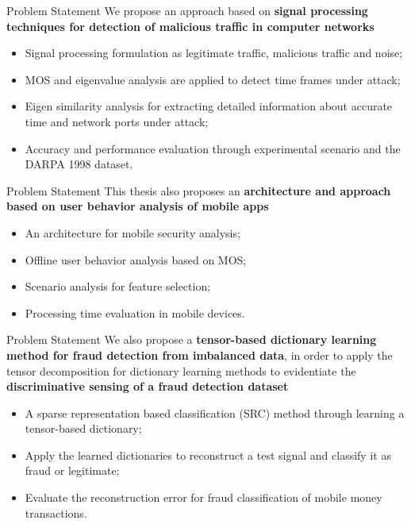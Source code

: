 \documentclass[newPxFont, numfooter, sectionpages]{beamer}
\begin{document}
\begin{frame}[c]{Problem Statement}
	We propose an approach based on \textbf{signal processing techniques for detection of malicious traffic in computer networks}
	\begin{itemize}
		\item Signal processing formulation as legitimate traffic, malicious traffic and noise;
		\item MOS and eigenvalue analysis are applied to detect time frames under attack;
		\item Eigen similarity analysis for extracting detailed information about accurate time and network ports under attack;
		\item Accuracy and performance evaluation through experimental scenario and the DARPA 1998 dataset.
	\end{itemize}
\end{frame}
\begin{frame}[c]{Problem Statement}
	This thesis also proposes an \textbf{architecture and approach based on user behavior analysis of mobile apps}
	\begin{itemize}
		\item An architecture for mobile security analysis;
		\item Offline user behavior analysis based on MOS;
		\item Scenario analysis for feature selection;
		\item Processing time evaluation in mobile devices.
	\end{itemize}
\end{frame}
\begin{frame}[c]{Problem Statement}
	We also propose a \textbf{tensor-based dictionary learning method for fraud detection from imbalanced data}, in order to apply the tensor decomposition for dictionary learning methods to evidentiate the \textbf{discriminative sensing of a fraud detection dataset}
	\begin{itemize}
		\item A sparse representation based classification (SRC) method through learning a tensor-based dictionary;
		\item Apply the learned dictionaries to reconstruct a test signal and classify it as fraud or legitimate;
		\item Evaluate the reconstruction error for fraud classification of mobile money transactions.
	\end{itemize}
\end{frame}
\end{document}
